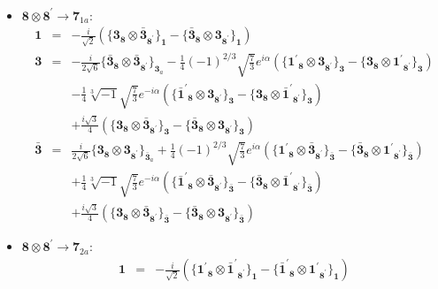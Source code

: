 \documentclass[english]{article}
\newcommand{\subcg}[3]{\big\{ {#1}\otimes{#2}\big\}^{}_{#3}}
\newcommand{\rep}[1]{\mathbf{#1}}
\begin{document}
\begin{itemize}
\begin{eqnarray*}
\end{eqnarray*}
\item $\rep{8}\otimes\rep{8^{\prime}}\to\rep{7}_{1a}$:
\begin{eqnarray*}
\rep{1} &=& -\frac{i}{\sqrt{2}}\left(\subcg{\rep{3}_{\rep{8}}}{\rep{\bar{3}}_{\rep{8^{\prime}}}}{\rep{1}}-\subcg{\rep{\bar{3}}_{\rep{8}}}{\rep{3}_{\rep{8^{\prime}}}}{\rep{1}}\right)
\\
\rep{3} &=& -\frac{i}{2 \sqrt{6}}\subcg{\rep{\bar{3}}_{\rep{8}}}{\rep{\bar{3}}_{\rep{8^{\prime}}}}{\rep{3}_{a}}-\frac{1}{4} (-1)^{2/3} \sqrt{\frac{7}{3}} e^{i \alpha }\left(\subcg{\rep{1^{\prime}}_{\rep{8}}}{\rep{3}_{\rep{8^{\prime}}}}{\rep{3}}-\subcg{\rep{3}_{\rep{8}}}{\rep{1^{\prime}}_{\rep{8^{\prime}}}}{\rep{3}}\right) \\ 
 & & -\frac{1}{4} \sqrt[3]{-1} \sqrt{\frac{7}{3}} e^{-i \alpha }\left(\subcg{\rep{\bar{1}^{\prime}}_{\rep{8}}}{\rep{3}_{\rep{8^{\prime}}}}{\rep{3}}-\subcg{\rep{3}_{\rep{8}}}{\rep{\bar{1}^{\prime}}_{\rep{8^{\prime}}}}{\rep{3}}\right) \\ 
 & & +\frac{i \sqrt{3}}{4}\left(\subcg{\rep{3}_{\rep{8}}}{\rep{\bar{3}}_{\rep{8^{\prime}}}}{\rep{3}}-\subcg{\rep{\bar{3}}_{\rep{8}}}{\rep{3}_{\rep{8^{\prime}}}}{\rep{3}}\right)
\\
\rep{\bar{3}} &=& \frac{i}{2 \sqrt{6}}\subcg{\rep{3}_{\rep{8}}}{\rep{3}_{\rep{8^{\prime}}}}{\rep{\bar{3}}_{a}}+\frac{1}{4} (-1)^{2/3} \sqrt{\frac{7}{3}} e^{i \alpha }\left(\subcg{\rep{1^{\prime}}_{\rep{8}}}{\rep{\bar{3}}_{\rep{8^{\prime}}}}{\rep{\bar{3}}}-\subcg{\rep{\bar{3}}_{\rep{8}}}{\rep{1^{\prime}}_{\rep{8^{\prime}}}}{\rep{\bar{3}}}\right) \\ 
 & & +\frac{1}{4} \sqrt[3]{-1} \sqrt{\frac{7}{3}} e^{-i \alpha }\left(\subcg{\rep{\bar{1}^{\prime}}_{\rep{8}}}{\rep{\bar{3}}_{\rep{8^{\prime}}}}{\rep{\bar{3}}}-\subcg{\rep{\bar{3}}_{\rep{8}}}{\rep{\bar{1}^{\prime}}_{\rep{8^{\prime}}}}{\rep{\bar{3}}}\right) \\ 
 & & +\frac{i \sqrt{3}}{4}\left(\subcg{\rep{3}_{\rep{8}}}{\rep{\bar{3}}_{\rep{8^{\prime}}}}{\rep{\bar{3}}}-\subcg{\rep{\bar{3}}_{\rep{8}}}{\rep{3}_{\rep{8^{\prime}}}}{\rep{\bar{3}}}\right)
\end{eqnarray*}
\item $\rep{8}\otimes\rep{8^{\prime}}\to\rep{7}_{2a}$:
\begin{eqnarray*}
\rep{1} &=& -\frac{i}{\sqrt{2}}\left(\subcg{\rep{1^{\prime}}_{\rep{8}}}{\rep{\bar{1}^{\prime}}_{\rep{8^{\prime}}}}{\rep{1}}-\subcg{\rep{\bar{1}^{\prime}}_{\rep{8}}}{\rep{1^{\prime}}_{\rep{8^{\prime}}}}{\rep{1}}\right)

\end{eqnarray*}
\end{itemize}
\end{document}
